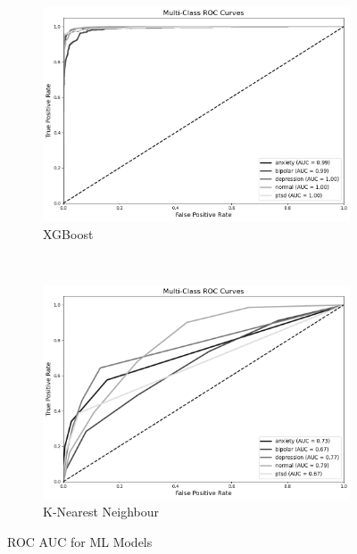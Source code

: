 \begin{figure}[H]
    \hfill
    \begin{subfigure}[b]{0.49\textwidth}
        \centering
        \includegraphics[width=\textwidth]{Images/XG ROC.png}
        \caption{XGBoost}
        \label{XGROC}  %
    \end{subfigure}\
    \hfill
    \begin{subfigure}[b]{0.49\textwidth}
        \centering
        \includegraphics[width=\textwidth]{Images/KNN ROC.png}
        \caption{K-Nearest Neighbour}
        \label{KNNROC}  %
    \end{subfigure}
    \label{fig:comparison}
    \caption{ROC AUC for ML Models}
\end{figure}

\pagebreak

